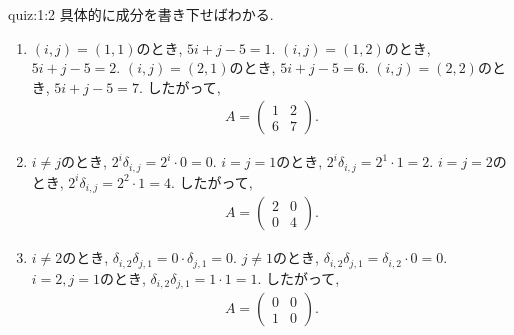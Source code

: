 \begin{answerof}{quiz:1:2}
  具体的に成分を書き下せばわかる.
  \begin{enumerate}
  \item
    $(i,j)=(1,1)$のとき, $5i+j-5=1$.
    $(i,j)=(1,2)$のとき, $5i+j-5=2$.
    $(i,j)=(2,1)$のとき, $5i+j-5=6$.
    $(i,j)=(2,2)$のとき, $5i+j-5=7$.
    したがって,
    \begin{align*}A=\begin{pmatrix}1&2\\6&7\end{pmatrix}.\end{align*}
  \item
    $i\neq j$のとき, $2^i\delta_{i,j}=2^i\cdot 0=0$.
    $i=j=1$のとき, $2^i\delta_{i,j}=2^1\cdot 1=2$.
    $i=j=2$のとき, $2^i\delta_{i,j}=2^2\cdot 1=4$.
    したがって,
    \begin{align*}A=\begin{pmatrix}2&0\\0&4\end{pmatrix}.\end{align*}
  \item
    $i\neq 2$のとき, $\delta_{i,2}\delta_{j,1}=0\cdot \delta_{j,1}=0$.
    $j\neq 1$のとき, $\delta_{i,2}\delta_{j,1}=\delta_{i,2}\cdot 0=0$.
    $i=2, j=1$のとき, $\delta_{i,2}\delta_{j,1}=1\cdot 1=1$.
    したがって,
    \begin{align*}A=\begin{pmatrix}0&0\\1&0\end{pmatrix}.\end{align*}
  \end{enumerate}
\end{answerof}
